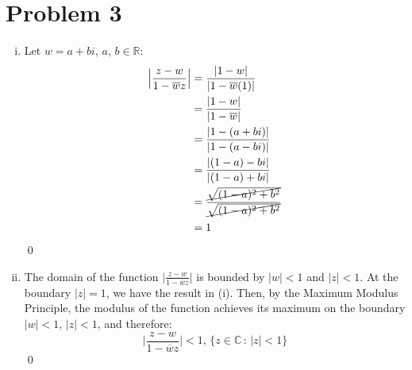 \documentclass[a4paper, titlepage, DIV=14]{scrartcl}
\begin{document}
    \section*{Problem 3}
    \begin{enumerate}[i)]
        \item Let $w=a + bi, \, a, \, b \in \mathbb{R}$:
        \begin{align*}
            \Big|\frac{z-w}{1-\overline{w}z}\Big| &= \frac{|1-w|}{|1-\overline{w}(1)|} \\
                &= \frac{|1-w|}{|1-\overline{w}|} \\
                &= \frac{|1-(a+bi)|}{|1-(a-bi)|} \\
                &= \frac{|(1-a) - bi|}{|(1-a) + bi|} \\
                &= \frac{\cancel{\sqrt{(1-a)^{2} + b^{2}}}}{\cancel{\sqrt{(1-a)^{2} + b^{2}}}} \\
                &= 1 
        \end{align*} \qed
        
        \item The domain of the function $\Big|\frac{z-w}{1-\overline{w}z}\Big|$ is bounded by $|w|<1$ and $|z|<1$. At the boundary $|z|=1$, we have the result in (i). Then,
        by the Maximum Modulus Principle, the modulus of the function achieves its maximum on the boundary $|w|<1, \, |z|<1$, and therefore:
        \begin{equation*}
            \Big|\frac{z-w}{1-\overline{w}z}\Big| < 1,\, \{z\in \mathbb{C} \,:\, |z|<1\}
        \end{equation*} \qed
    \end{enumerate}
\end{document}
